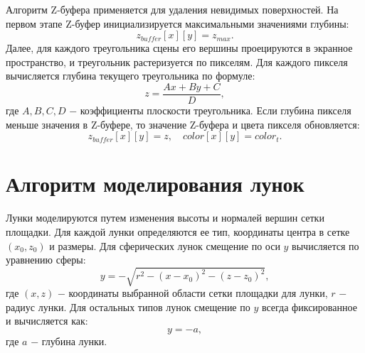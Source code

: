 Алгоритм Z-буфера применяется для удаления невидимых поверхностей. На первом этапе Z-буфер инициализируется максимальными значениями глубины:
\begin{equation}
    \label{for}
    z_{buffer}[x][y] = z_{max}.
\end{equation}
Далее, для каждого треугольника сцены его вершины проецируются в экранное пространство, и треугольник растеризуется по пикселям. Для каждого пикселя вычисляется глубина текущего треугольника по формуле:
\begin{equation}
    \label{for}
    z = \frac{Ax + By + C}{D},
\end{equation}
где $A, B, C, D$ $-$ коэффициенты плоскости треугольника. Если глубина пикселя меньше значения в Z-буфере, то значение Z-буфера и цвета пикселя обновляется:
\begin{equation}
    \label{for}
    z_{buffer}[x][y] = z, \quad color[x][y] = color_{t}.
\end{equation}

\section{Алгоритм моделирования лунок}

Лунки моделируются путем изменения высоты и нормалей вершин сетки площадки. Для каждой лунки определяются ее тип, координаты центра в сетке $(x_0, z_0)$ и размеры. Для сферических лунок смещение по оси $y$ вычисляется по уравнению сферы:
\begin{equation}
    \label{for}
    y = -\sqrt{r^2 - (x - x_0)^2 - (z - z_0)^2},
\end{equation}
где $(x, z)$ $-$ координаты выбранной области сетки площадки для лунки, $r$ $-$ радиус лунки. Для остальных типов лунок смещение по $y$ всегда фиксированное и вычисляется как:
\begin{equation}
    \label{for}
    y = -a,
\end{equation}
где $a$ $-$ глубина лунки.

